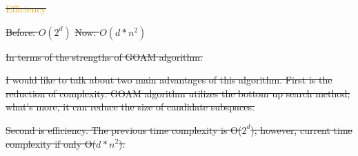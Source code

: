 \documentclass[
 size=14pt,
 paper=smartboard,  %
 mode=present, 		%
 display=slides, 	%
 style=tuliplab,  	%
 pauseslide,
 fleqn,leqno]{powerdot}
\providecommand{\DIFdeltex}[1]{{\protect\color{red}\sout{#1}}}                      %
\providecommand{\DIFdelbegin}{} %
\providecommand{\DIFdelend}{} %
\providecommand{\DIFdel}[1]{\texorpdfstring{\DIFdeltex{#1}}{}} %
\newcommand{\DIFscaledelfig}{0.5}
\newlength{\DIFdelgraphicswidth} %
\newlength{\DIFdelgraphicsheight} %
\newcommand{\DIFdelincludegraphics}[2][]{%
\sbox{\DIFdelgraphicsbox}{\DIFOincludegraphics[#1]{#2}}%
\settoboxwidth{\DIFdelgraphicswidth}{\DIFdelgraphicsbox} %
\settoboxtotalheight{\DIFdelgraphicsheight}{\DIFdelgraphicsbox} %
\scalebox{\DIFscaledelfig}{%
\parbox[b]{\DIFdelgraphicswidth}{\usebox{\DIFdelgraphicsbox}\\[-\baselineskip] \rule{\DIFdelgraphicswidth}{0em}}\llap{\resizebox{\DIFdelgraphicswidth}{\DIFdelgraphicsheight}{%
\setlength{\unitlength}{\DIFdelgraphicswidth}%
\begin{picture}(1,1)%
\thicklines\linethickness{2pt} %
{\color[rgb]{1,0,0}\put(0,0){\framebox(1,1){}}}%
{\color[rgb]{1,0,0}\put(0,0){\line( 1,1){1}}}%
{\color[rgb]{1,0,0}\put(0,1){\line(1,-1){1}}}%
\end{picture}%
}\hspace*{3pt}}} %
} %
\DeclareRobustCommand{\DIFdelbegin}{\DIFOdelbegin \let\includegraphics\DIFdelincludegraphics} %
\DeclareRobustCommand{\DIFdelend}{\DIFOaddend \let\includegraphics\DIFOincludegraphics} %
\begin{document}
\DIFdelbegin %
\DIFdel{\textcolor{orange}{Efficiency}
}\DIFdelend %

\DIFdelbegin %
\DIFdel{Before: $O(2^d)$  }%
\DIFdel{Now:    $O(d*n^{2})$
}\DIFdelend %

\DIFdelbegin %
\DIFdelend %

\DIFdelbegin %
\DIFdel{In terms of the strengths of GOAM algorithm.
}%

\DIFdel{I would like to talk about two main advantages of this algorithm.
First is the reduction of complexity.
GOAM algorithm utilizes the bottom up search method;
what's more,
it can reduce the size of candidate subspaces.
}%

\DIFdel{Second is efficiency.
The previous time complexity is O($2^d$);
however,
current time complexity if only O($d*n^2$).
}%

\DIFdelend %
\end{document}

